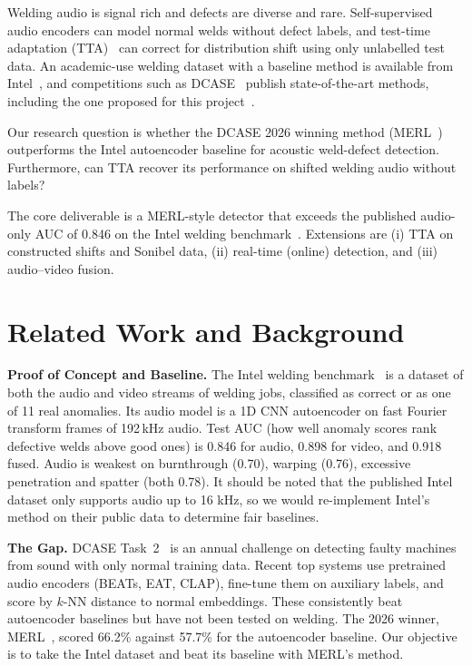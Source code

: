 \documentclass[11pt]{article}
\begin{document}
Welding audio is signal rich and defects are diverse and rare. Self-supervised audio encoders can model normal welds without defect labels, and test-time adaptation (TTA)~\cite{bnadapt,actmad,sar,note} can correct for distribution shift using only unlabelled test data. An academic-use welding dataset with a baseline method is available from Intel~\cite{intel}, and competitions such as DCASE~\cite{dcase} publish state-of-the-art methods, including the one proposed for this project~\cite{merl}.

Our research question is whether the DCASE 2026 winning method (MERL~\cite{merl}) outperforms the Intel autoencoder baseline for acoustic weld-defect detection. Furthermore, can TTA recover its performance on shifted welding audio without labels?

The core deliverable is a MERL-style detector that exceeds the published audio-only AUC of 0.846 on the Intel welding benchmark~\cite{intel}. Extensions are (i) TTA on constructed shifts and Sonibel data, (ii) real-time (online) detection, and (iii) audio--video fusion.

\setlength{\parskip}{0.2em}
\section{Related Work and Background}

\textbf{Proof of Concept and Baseline.} The Intel welding benchmark~\cite{intel} is a dataset of both the audio and video streams of welding jobs, classified as correct or as one of 11 real anomalies. Its audio model is a 1D CNN autoencoder on fast Fourier transform frames of 192\,kHz audio. Test AUC (how well anomaly scores rank defective welds above good ones) is 0.846 for audio, 0.898 for video, and 0.918 fused. Audio is weakest on burnthrough (0.70), warping (0.76), excessive penetration and spatter (both 0.78). It should be noted that the published Intel dataset only supports audio up to 16 kHz, so we would re-implement Intel's method on their public data to determine fair baselines.

\textbf{The Gap.} DCASE Task~2~\cite{dcase} is an annual challenge on detecting faulty machines from sound with only normal training data. Recent top systems use pretrained audio encoders (BEATs, EAT, CLAP), fine-tune them on auxiliary labels, and score by $k$-NN distance to normal embeddings. These consistently beat autoencoder baselines but have not been tested on welding. The 2026 winner, MERL~\cite{merl}, scored 66.2\% against 57.7\% for the autoencoder baseline.
Our objective is to take the Intel dataset and beat its baseline with MERL's method.
\end{document}

